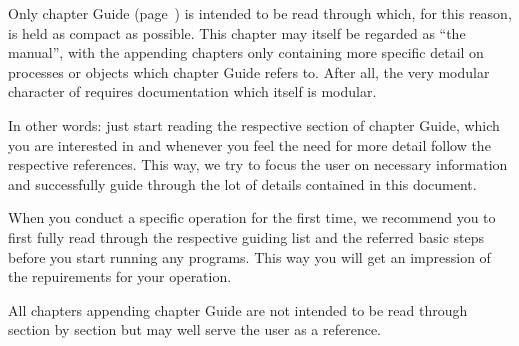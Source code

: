 
%
%
%
Only chapter Guide (page~\pageref{guide}) is intended to be read through which, for this reason, is held as compact 
as possible. This chapter may itself be regarded as ``the manual'', with the appending chapters only 
containing more specific detail on processes or objects which chapter Guide refers to.
After all, the very modular character of \ASKI requires documentation which itself is modular.

In other words: just start reading the respective section of chapter Guide, which you are interested in 
and whenever you feel the need for more detail follow the respective references. This way, we try to focus
the user on necessary information and successfully guide through the lot of details contained in this document. 

When you conduct a specific \ASKI operation for the first time, we recommend you to first fully read through the 
respective guiding list and the referred basic steps before you start running any programs. This way you will 
get an impression of the repuirements for your operation.

All chapters appending chapter Guide are not intended to be read through section by section but may well
serve the user as a reference. 

\vspace{1cm}



